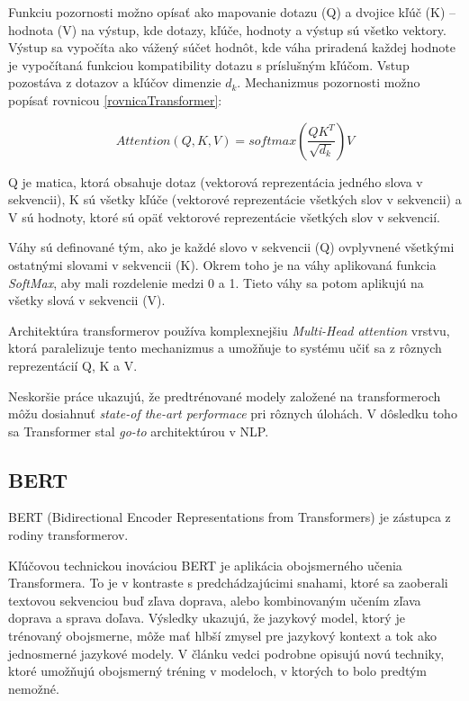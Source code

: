 Funkciu pozornosti možno opísať ako mapovanie dotazu (Q) a dvojice kľúč (K) – hodnota (V) na výstup, kde dotazy, kľúče, hodnoty a výstup sú všetko vektory. Výstup sa vypočíta ako vážený súčet hodnôt, kde váha priradená každej hodnote je vypočítaná funkciou kompatibility dotazu s príslušným kľúčom. Vstup pozostáva z dotazov a kľúčov dimenzie \(d_{k}\).
Mechanizmus pozornosti možno popísať rovnicou \eqref{rovnicaTransformer}: 

\begin{equation}
	Attention(Q, K, V)=  softmax(\dfrac{QK^{T}}{\sqrt{d_{k}}})V \label{rovnicaTransformer}
\end{equation}

Q je matica, ktorá obsahuje dotaz (vektorová reprezentácia jedného slova v sekvencii), K sú všetky kľúče (vektorové reprezentácie všetkých slov v sekvencii) a V sú hodnoty, ktoré sú opäť vektorové reprezentácie všetkých slov v sekvencií.

Váhy sú definované tým, ako je každé slovo v sekvencii (Q) ovplyvnené všetkými ostatnými slovami v sekvencii (K). Okrem toho je na váhy aplikovaná funkcia \textit{SoftMax}, aby mali rozdelenie medzi 0 a 1. Tieto váhy sa potom aplikujú na všetky slová v sekvencii (V).

Architektúra transformerov používa komplexnejšiu \textit{Multi-Head attention} vrstvu, ktorá paralelizuje tento mechanizmus a umožňuje to systému učiť sa z rôznych reprezentácií Q, K a V. 

Neskoršie práce ukazujú, že predtrénované modely založené na transformeroch môžu dosiahnuť \textit{state-of the-art performace} pri rôznych úlohách. V dôsledku toho sa Transformer stal \textit{go-to} architektúrou v NLP. \cite{Tianyang:2021} \cite{Allard:2019}

\subsection{BERT}

BERT \cite{Devlin:2018} (Bidirectional Encoder Representations from Transformers) je
zástupca z rodiny transformerov. 

Kľúčovou technickou inováciou BERT je aplikácia obojsmerného učenia Transformera. To je v kontraste s predchádzajúcimi snahami, ktoré sa zaoberali textovou sekvenciou buď zľava doprava, alebo kombinovaným učením zľava doprava a sprava doľava. Výsledky ukazujú, že jazykový model, ktorý je trénovaný obojsmerne, môže mať hlbší zmysel pre jazykový kontext a tok ako jednosmerné jazykové modely. V článku vedci podrobne opisujú novú techniky, ktoré umožňujú obojsmerný tréning v modeloch, v ktorých to bolo predtým nemožné.

